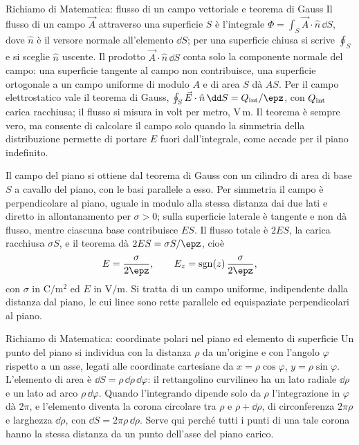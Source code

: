 \documentclass[main.tex]{subfiles}
\begin{document}
	\begin{riquadro}{Richiamo di Matematica: flusso di un campo vettoriale e teorema di Gauss}
		Il flusso di un campo $\vec A$ attraverso una superficie $S$ è l'integrale $\Phi=\int_S\vec A\cdot\hat n\,\dd S$, dove $\hat n$ è il versore normale all'elemento $\dd S$; per una superficie chiusa si scrive $\oint_S$ e si sceglie $\hat n$ uscente. Il prodotto $\vec A\cdot\hat n\,\dd S$ conta solo la componente normale del campo: una superficie tangente al campo non contribuisce, una superficie ortogonale a un campo uniforme di modulo $A$ e di area $S$ dà $AS$. Per il campo elettrostatico vale il teorema di Gauss, $\oint_S\vec E\cdot\hat n\,\dd S=Q_{\rm int}/\epz$, con $Q_{\rm int}$ carica racchiusa; il flusso si misura in volt per metro, $\mathrm{V\,m}$. Il teorema è sempre vero, ma consente di calcolare il campo solo quando la simmetria della distribuzione permette di portare $E$ fuori dall'integrale, come accade per il piano indefinito.
	\end{riquadro}
	
	Il campo del piano si ottiene dal teorema di Gauss con un cilindro di area di base $S$ a cavallo del piano, con le basi parallele a esso. Per simmetria il campo è perpendicolare al piano, uguale in modulo alla stessa distanza dai due lati e diretto in allontanamento per $\sigma>0$; sulla superficie laterale è tangente e non dà flusso, mentre ciascuna base contribuisce $ES$. Il flusso totale è $2ES$, la carica racchiusa $\sigma S$, e il teorema dà $2ES=\sigma S/\epz$, cioè
	\[
	E=\frac{\sigma}{2\epz},\qquad E_z=\operatorname{sgn}(z)\,\frac{\sigma}{2\epz},
	\]
	con $\sigma$ in $\mathrm{C/m^2}$ ed $E$ in $\mathrm{V/m}$. Si tratta di un campo uniforme, indipendente dalla distanza dal piano, le cui linee sono rette parallele ed equispaziate perpendicolari al piano.
	
	\begin{riquadro}{Richiamo di Matematica: coordinate polari nel piano ed elemento di superficie}
		Un punto del piano si individua con la distanza $\rho$ da un'origine e con l'angolo $\varphi$ rispetto a un asse, legati alle coordinate cartesiane da $x=\rho\cos\varphi$, $y=\rho\sin\varphi$. L'elemento di area è $\dd S=\rho\,\dd\rho\,\dd\varphi$: il rettangolino curvilineo ha un lato radiale $\dd\rho$ e un lato ad arco $\rho\,\dd\varphi$. Quando l'integrando dipende solo da $\rho$ l'integrazione in $\varphi$ dà $2\pi$, e l'elemento diventa la corona circolare tra $\rho$ e $\rho+\dd\rho$, di circonferenza $2\pi\rho$ e larghezza $\dd\rho$, con $\dd S=2\pi\rho\,\dd\rho$. Serve qui perché tutti i punti di una tale corona hanno la stessa distanza da un punto dell'asse del piano carico.
	\end{riquadro}
	
\end{document}
